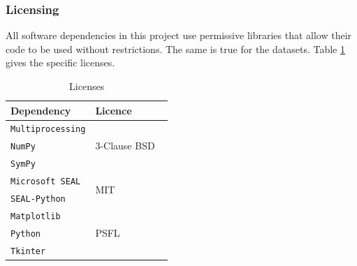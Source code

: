 \subsubsection{Licensing}
\setlength{\leftskip}{0.5cm}
\indent \indent
All software dependencies in this project use permissive libraries that allow their code to be used without restrictions. The same is true for the datasets. Table \ref{tab:licensing} gives the specific licenses.
\begin{table}[ht]
\centering
\def\arraystretch{1.25}
\begin{tabular}{|p{5cm}|p{4cm}|}
    \hline
    \textbf{Dependency} & \textbf{Licence} \\
    \hline \hline
    \texttt{Multiprocessing} & \multirow{3}{*}{3-Clause BSD ~\cite{BSD}} \\ 
    \texttt{NumPy} & \\ 
    \texttt{SymPy} & \\
    \hline
    \texttt{Microsoft SEAL} & \multirow{2}{*}{MIT ~\cite{MIT}} \\
    \texttt{SEAL-Python} & \\
    \hline
    \texttt{Matplotlib} & \multirow{3}{*}{PSFL ~\cite{PSFL}} \\ 
    \texttt{Python} & \\
    \texttt{Tkinter} & \\
    \hline
\end{tabular}
\caption{Licenses}
\label{tab:licensing}
\end{table}

\setlength{\leftskip}{0cm}

\bigskip \bigskip

